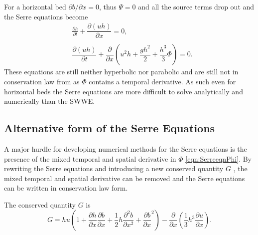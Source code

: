 For a horizontal bed $\partial b / \partial x = 0$, thus $\Psi = 0$ and all the source terms drop out and the Serre equations become
\begin{subequations}
	\label{eqn:FullSerreNonConHorizbed}
	\begin{align}
	\label{eqn:FullSerreNonConMassHorizbed}
	&\frac{\partial h}{\partial t} + \dfrac{\partial (uh)}{\partial x} = 0, \\ \nonumber \\
	\label{eqn:FullSerreNonConMomeHorizbed}
	&\dfrac{\partial (uh)}{\partial t} + \dfrac{\partial}{\partial x} \left ( u^2h + \dfrac{gh^2}{2} + \dfrac{h^3}{3}{ \Phi }  \right ) = 0.
	\end{align}
\end{subequations}	
These equations are still neither hyperbolic nor parabolic and are still not in conservation law from as $\Phi$ contains a temporal derivative. As such even for horizontal beds the Serre equations are more difficult to solve analytically and numerically than the SWWE. 

\subsection{Alternative form of the Serre Equations}
A major hurdle for developing numerical methods for the Serre equations is the presence of the mixed temporal and spatial derivative in $\Phi$ \eqref{eqn:SerreeqnPhi}. By rewriting the Serre  equations and introducing a new conserved quantity $G$ \cite{Hank-etal-2010-2034,Zoppou-2014,Li-2014-169}, the mixed temporal and spatial derivative can be removed and the Serre equations can be written in conservation law form.
\begin{defn}
	\label{defn:SerreEqnConservedQuantity1}
	The conserved quantity $G$ is
	\[ G =  h {u} \left(1 + \frac{\partial h}{\partial x}\frac{\partial b}{\partial x} + \frac{1}{2}h\frac{\partial^2 b}{\partial x^2} + \frac{\partial b}{\partial x}^2 \right) - \frac{\partial}{\partial x}\left(\frac{1}{3}h^3  \frac{\partial {u}}{\partial x}\right).\]
\end{defn}


